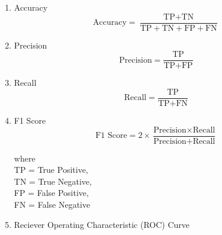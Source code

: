 	\begin{enumerate}
		\item Accuracy
		\begin{equation}
				\text{Accuracy} = \frac{\text{TP} + \text{TN}}{\text{TP} + \text{TN} + \text{FP} + \text{FN}}
		\end{equation}
		\item Precision
		\begin{equation}
				\text{Precision} = \frac{\text{TP}}{\text{TP} + \text{FP}}
		\end{equation}
		\item Recall
		\begin{equation}
			\text{Recall} = \frac{\text{TP}}{\text{TP} + \text{FN}}
		\end{equation}
		\item F1 Score
		\begin{equation}
			\text{F1 Score} = 2 \times \frac{\text{Precision} \times \text{Recall}}{\text{Precision} + \text{Recall}}
		\end{equation}

		where\\
		TP = True Positive,\\
		TN = True Negative,\\
		FP = False Positive,\\
		FN = False Negative
		\pagebreak
		\item Reciever Operating Characteristic (ROC) Curve
			\begin{figure}[hbt!]
			\end{figure}


\end{enumerate}

